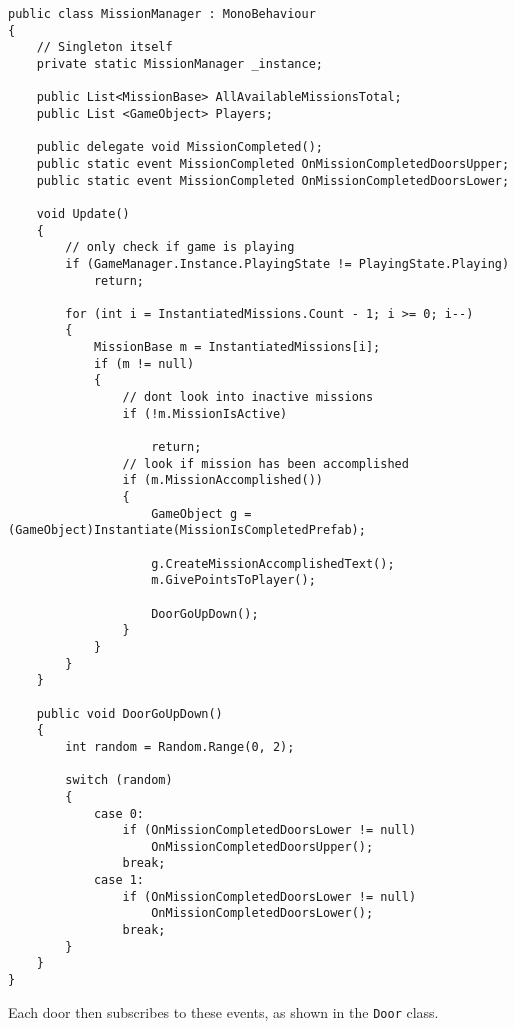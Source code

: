 \begin{lstlisting}
public class MissionManager : MonoBehaviour
{
    // Singleton itself
    private static MissionManager _instance;
    
    public List<MissionBase> AllAvailableMissionsTotal;
    public List <GameObject> Players;

    public delegate void MissionCompleted();
    public static event MissionCompleted OnMissionCompletedDoorsUpper;
    public static event MissionCompleted OnMissionCompletedDoorsLower;

    void Update()
    {
		// only check if game is playing
        if (GameManager.Instance.PlayingState != PlayingState.Playing) 
            return;

        for (int i = InstantiatedMissions.Count - 1; i >= 0; i--)
        {
            MissionBase m = InstantiatedMissions[i];
            if (m != null)
            {
            	// dont look into inactive missions
                if (!m.MissionIsActive)
                
                    return;
				// look if mission has been accomplished
                if (m.MissionAccomplished()) 
                {
                    GameObject g = (GameObject)Instantiate(MissionIsCompletedPrefab);
                    
                    g.CreateMissionAccomplishedText();
                    m.GivePointsToPlayer();

                    DoorGoUpDown();
                }
            }
        }
    }

    public void DoorGoUpDown()
    {
        int random = Random.Range(0, 2);

        switch (random)
        {
            case 0:
                if (OnMissionCompletedDoorsLower != null)
                    OnMissionCompletedDoorsUpper();
                break;
            case 1:
                if (OnMissionCompletedDoorsLower != null)
                    OnMissionCompletedDoorsLower();
                break;
        }
    }
}

\end{lstlisting}

Each door then subscribes to these events, as shown in the \texttt{Door} class.

